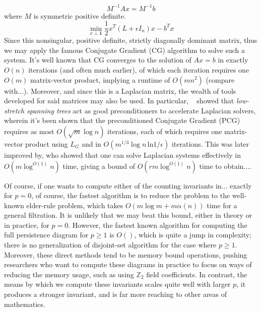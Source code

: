 \documentclass[10pt]{article}
\numberwithin{equation}{section}
\newcommand{\+}{%
	\raisebox{0.18ex}{\scaleobj{0.55}{+}}
}
\theoremstyle{definition}
\begin{document}
$$
M^{-1} A x = M^{-1}b 
$$
where $M$ is symmetric positive definite. 
\begin{equation}
	\min_{x \perp \mathbf{1} } \frac{1}{2} x^T (L + \epsilon I_n) x - b^T x
\end{equation}
Since this nonsingular, positive definite, strictly diagonally dominant matrix, thus we may apply the famous Conjugate Gradient (CG) algorithm to solve such a system. It's well known that CG converges to the solution of $A x = b$ in exactly $O(n)$ iterations (and often much earlier), of which each iteration requires one $O(m)$ matrix-vector product, implying a runtime of $O(mn^2)$ (compare with...).  
Moreover, and since this is a Laplacian matrix, the wealth of tools developed for said matrices may also be used.
In particular, ~\cite{} showed that \emph{low-stretch spanning trees} act as good preconditioners to accelerate Laplacian solvers, wherein it's been shown that the preconditioned Conjugate Gradient (PCG) requires as most $O(\sqrt{m} \log n)$ iterations, each of which requires one matrix-vector product using $L_G$ and in $O(m^{1/3} \log n \, \mathrm{ln} 1/\epsilon)$ iterations. 
This was later improved by, who showed that one can solve Laplacian systems effectively in $O(m \log^{O(1)} n)$ time, giving a bound of $O(r m \log^{O(1)} n)$ time to obtain.... 

Of course, if one wants to compute either of the counting invariants in... exactly for $p = 0$, of course, the fastest algorithm is to reduce the problem to the well-known elder-rule problem, which takes $O(m \log m + m \alpha(n))$ time for a general filtration. It is unlikely that we may beat this bound, either in theory or in practice, for $p = 0$.
However, the fastest known algorithm for computing the full persistence diagram for $p \geq 1$ is $O()$, which is quite a jump in complexity; there is no generalization of disjoint-set algorithm for the case where $p \geq 1$. 
Moreover, these direct methods tend to be memory bound operations, pushing researchers who want to compute these diagrams in practice to focus on ways of reducing the memory usage, such as using $\mathbb{Z}_2$ field coefficients. 
In contrast, the means by which we compute these invariants scales quite well with larger $p$, it produces a stronger invariant, and is far more reaching to other areas of mathematics. 
\end{document}
